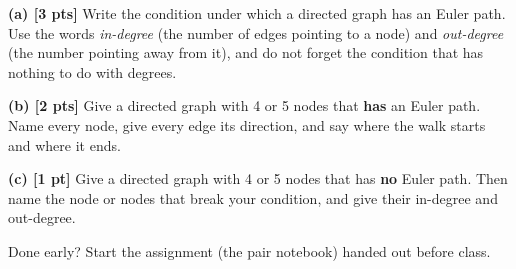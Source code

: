 \documentclass[a4paper, 12pt]{extarticle}
\begin{document}
\vspace{0.2em}

\textbf{(a) [3 pts]} Write the condition under which a directed graph has an
Euler path. Use the words \emph{in-degree} (the number of edges pointing to a
node) and \emph{out-degree} (the number pointing away from it), and do not
forget the condition that has nothing to do with degrees.

\vspace{0.2em}

\textbf{(b) [2 pts]} Give a directed graph with 4 or 5 nodes that \textbf{has}
an Euler path. Name every node, give every edge its direction, and say where
the walk starts and where it ends.

\vspace{0.2em}

\textbf{(c) [1 pt]} Give a directed graph with 4 or 5 nodes that has
\textbf{no} Euler path. Then name the node or nodes that break your condition,
and give their in-degree and out-degree.

\vfill

{\footnotesize\color{rulegrey}
Done early? Start the assignment (the pair notebook) handed out before class.}
\end{document}
